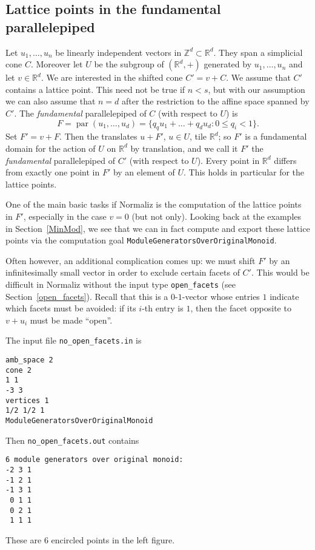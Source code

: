 \documentclass[12pt,a4paper]{scrartcl}
\theoremstyle{definition}
\def\ZZ{{\mathbb Z}}
\def\RR{{\mathbb R}}
\DeclareMathOperator{\para}{par}
\begin{document}
\subsection{Lattice points in the fundamental parallelepiped}\label{LattPointsFPE}

Let $u_1,\dots,u_n$ be linearly independent vectors in $\ZZ^d\subset\RR^d$. They span a simplicial cone $C$. Moreover let $U$ be the subgroup of $(\RR^d,+)$ generated by $u_1,\dots,u_n$ and let $v\in\RR^d$. We are interested in the shifted cone $C'=v+C$. We assume that $C'$ contains a lattice point. This need not be true if $n<s$, but with our assumption we can also assume that $n=d$ after the restriction to the affine space spanned by $C'$. The \emph{fundamental} parallelepiped of $C$ (with respect to $U$) is
$$
F=\para(u_1,\dots,u_d)=\{q_qu_1+\dots+q_du_d: 0\le q_i<1\}.
$$
Set $F'=v+F$. Then the translates $u+F'$, $u\in U$, tile $\RR^d$; so $F'$ is a fundamental domain for the action of $U$ on $\RR^d$ by translation, and we call it $F'$ the \emph{fundamental} parallelepiped of $C'$ (with respect to $U$). Every point in $\RR^d$ differs from exactly one point in $F'$ by an element of $U$. This holds in particular for the lattice points.

One of the main basic tasks if Normaliz is the computation of the lattice points in $F'$, especially in the case $v=0$ (but not only). Looking back at the examples in Section~\ref{MinMod}, we see that we can in fact compute and export these lattice points via the computation goal \verb|ModuleGeneratorsOverOriginalMonoid|.

Often however, an additional complication comes up: we must shift $F'$ by an infinitesimally small vector in order to exclude certain facets of $C'$. This would be difficult in Normaliz without the input type \verb|open_facets| (see Section~\ref{open_facets}). Recall that this is a $0$-$1$-vector whose entries $1$ indicate which facets must be avoided: if its $i$-th entry is $1$, then the facet opposite to $v+u_i$ must be made ``open''.

The input file \verb|no_open_facets.in| is
\begin{Verbatim}
amb_space 2
cone 2
1 1
-3 3
vertices 1
1/2 1/2 1
ModuleGeneratorsOverOriginalMonoid
\end{Verbatim}

Then \verb|no_open_facets.out| contains
\begin{Verbatim}
6 module generators over original monoid:
-2 3 1
-1 2 1
-1 3 1
 0 1 1
 0 2 1
 1 1 1
\end{Verbatim}
These are $6$ encircled points in the left figure.
\end{document}
